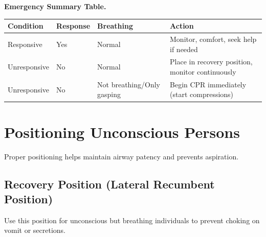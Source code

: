 \medskip\noindent\textbf{Emergency Summary Table.}
\begin{center}
\begin{tabularx}{\textwidth}{@{}>{\raggedright\arraybackslash}X>{\raggedright\arraybackslash}X>{\raggedright\arraybackslash}X>{\raggedright\arraybackslash}X@{}}
\hline
\textbf{Condition} & \textbf{Response} & \textbf{Breathing} & \textbf{Action} \\
\hline
Responsive & Yes & Normal & Monitor, comfort, seek help if needed \\
Unresponsive & No & Normal & Place in recovery position, monitor continuously \\
Unresponsive & No & Not breathing/Only gasping & Begin CPR immediately (start compressions) \\
\hline
\end{tabularx}
\end{center}

\section{Positioning Unconscious Persons}

Proper positioning helps maintain airway patency and prevents aspiration.

\subsection{Recovery Position (Lateral Recumbent Position)}\label{sec:recovery_position}

Use this position for unconscious but breathing individuals to prevent choking on vomit or secretions.

